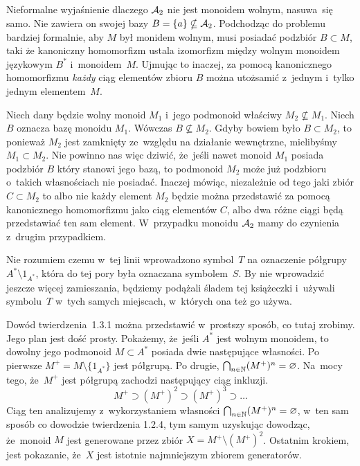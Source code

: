 \documentclass[a4paper,11pt]{article}
\begin{document}
Nieformalne wyjaśnienie dlaczego $\mathcal{A}_{ 2 }$ nie jest monoidem
wolnym, nasuwa~się samo. Nie zawiera on swojej bazy
$B = \{ a \} \nsubseteq \mathcal{A}_{ 2 }$. Podchodząc do problemu bardziej
formalnie, aby $M$ był monidem wolnym, musi posiadać podzbiór
$B \subset M$, taki że kanoniczny homomorfizm ustala izomorfizm między
wolnym monoidem językowym $B^{ * }$ i~monoidem~$M$. Ujmując to
inaczej, za pomocą kanonicznego homomorfizmu \textit{każdy} ciąg
elementów zbioru $B$ można utożsamić z~jednym i~tylko jednym
elementem~$M$.

Niech dany będzie wolny monoid $M_{ 1 }$ i~jego podmonoid właściwy
$M_{ 2 } \nsubseteq M_{ 1 }$. Niech $B$ oznacza bazę monoidu
$M_{ 1 }$. Wówczas $B \nsubseteq M_{ 2 }$. Gdyby bowiem było
$B \subset M_{ 2 }$, to ponieważ $M_{ 2 }$ jest zamknięty ze~względu
na działanie wewnętrzne, mielibyśmy $M_{ 1 } \subset M_{ 2 }$. Nie
powinno nas więc dziwić, że~jeśli nawet monoid $M_{ 1 }$ posiada
podzbiór $B$ który stanowi jego bazą, to podmonoid $M_{ 2 }$ może już
podzbioru o~takich własnościach nie posiadać. Inaczej mówiąc,
niezależnie od tego jaki zbiór $C \subset M_{ 2 }$ to albo nie każdy
element $M_{ 2 }$ będzie można przedstawić za pomocą kanonicznego
homomorfizmu jako ciąg elementów $C$, albo dwa różne ciągi będą
przedstawiać ten sam element. W~przypadku monoidu $\mathcal{A}_{ 2 }$ mamy
do czynienia z~drugim przypadkiem.

\vspace{\spaceFour}





\start {} Nie rozumiem czemu w~tej linii wprowadzono
symbol~$T$ na oznaczenie półgrupy $A^{ * } \setminus 1_{ A^{ * } }$,
która do tej pory była oznaczana symbolem~$S$. By nie wprowadzić
jeszcze więcej zamieszania, będziemy podążali śladem tej książeczki
i~używali symbolu~$T$ w~tych samych miejscach, w~których ona też go
używa.

\vspace{\spaceFour}





\start {} Dowód twierdzenia~1.3.1 można przedstawić w~prostszy
sposób, co tutaj zrobimy. Jego plan jest dość prosty. Pokażemy,
że~jeśli $A^{ * }$ jest wolnym monoidem, to dowolny jego podmonoid
$M \subset A^{ * }$ posiada dwie następujące własności. Po pierwsze
$M^{ + } = M \setminus \{ 1_{ A^{ * } } \}$ jest półgrupą. Po drugie,
$\bigcap_{ n \in \mathbb{N} } ( M^{ + } )^{ n } = \varnothing$. Na~mocy tego,
że~$M^{ + }$ jest półgrupą zachodzi następujący ciąg inkluzji.
\begin{equation}
  \label{eq:1}
  M^{ + } \supset ( M^{ + } )^{ 2 } \supset ( M^{ + } )^{ 3 } \supset \ldots
\end{equation}
Ciąg ten analizujemy z~wykorzystaniem własności
$\bigcap_{ n \in \mathbb{N} } ( M^{ + } )^{ n } = \varnothing$, w~ten sam
sposób co dowodzie twierdzenia 1.2.4, tym samym uzyskując dowodząc,
że~monoid $M$ jest generowane przez zbiór
$X = M^{ + } \setminus ( M^{ + } )^{ 2 }$. Ostatnim krokiem, jest pokazanie,
że~$X$ jest istotnie najmniejszym zbiorem generatorów.
\end{document}
